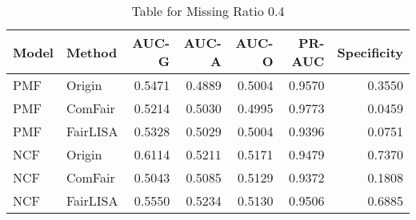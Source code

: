\begin{table}
\centering
\caption{Table for Missing Ratio 0.4}
\label{tab:missing_0.4}
\begin{tabular}{llrrrrr}
\toprule
Model &   Method &  AUC-G &  AUC-A &  AUC-O &  PR-AUC &  Specificity \\
\midrule
  PMF &   Origin & 0.5471 & 0.4889 & 0.5004 &  0.9570 &       0.3550 \\
  PMF &  ComFair & 0.5214 & 0.5030 & 0.4995 &  0.9773 &       0.0459 \\
  PMF & FairLISA & 0.5328 & 0.5029 & 0.5004 &  0.9396 &       0.0751 \\
  NCF &   Origin & 0.6114 & 0.5211 & 0.5171 &  0.9479 &       0.7370 \\
  NCF &  ComFair & 0.5043 & 0.5085 & 0.5129 &  0.9372 &       0.1808 \\
  NCF & FairLISA & 0.5550 & 0.5234 & 0.5130 &  0.9506 &       0.6885 \\
\bottomrule
\end{tabular}
\end{table}
